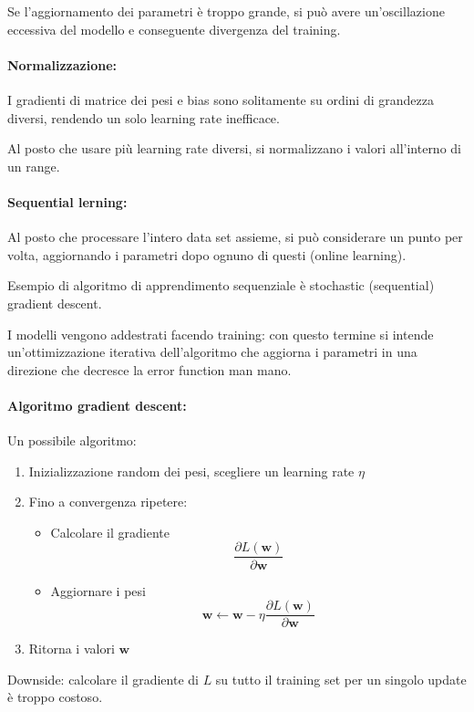 Se l'aggiornamento dei parametri è troppo grande, si può avere un'oscillazione eccessiva del modello e conseguente divergenza del training.

\paragraph{Normalizzazione:} I gradienti di matrice dei pesi e bias sono solitamente su ordini di grandezza diversi, rendendo un solo learning rate inefficace. 

Al posto che usare più learning rate diversi, si normalizzano i valori all'interno di un range.

\paragraph{Sequential lerning:} Al posto che processare l'intero data set assieme, si può considerare un punto per volta, aggiornando i parametri dopo ognuno di questi (online learning).

Esempio di algoritmo di apprendimento sequenziale è stochastic (sequential) gradient descent. 

I modelli vengono addestrati facendo training: con questo termine si intende un'ottimizzazione iterativa dell'algoritmo che aggiorna i parametri in una direzione che decresce la error function man mano.

\paragraph{Algoritmo gradient descent:} Un possibile algoritmo:
\begin{enumerate}
    \item Inizializzazione random dei pesi, scegliere un learning rate $\eta$
    
    \item Fino a convergenza ripetere:
    \begin{itemize}
        \item Calcolare il gradiente
        $$ \frac{\partial L (\bm w)}{\partial \bm w} $$
        
        \item Aggiornare i pesi
        $$ \bm w \leftarrow \bm w - \eta \frac{\partial L (\bm w)}{\partial \bm w} $$
    \end{itemize}
    
    \item Ritorna i valori $\bm w$
\end{enumerate}
Downside: calcolare il gradiente di $L$ su tutto il training set per un singolo update è troppo costoso.


